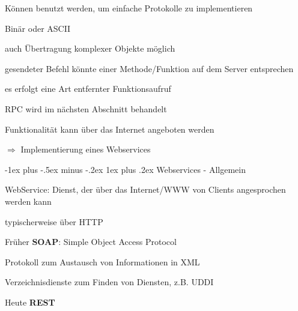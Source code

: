 \documentclass[10pt]{article}
\makeatletter
\renewcommand{\subsubsection}{\@startsection{subsubsection}{3}{0mm}%
                                {-1ex plus -.5ex minus -.2ex}%
                                {1ex plus .2ex}%
                                {\normalfont\small\bfseries}}
\makeatother
\begin{document}
\begin{itemize*}
  \item Können benutzt werden, um einfache Protokolle zu implementieren
  \item Binär oder ASCII
  \begin{itemize*}
    \item auch Übertragung komplexer Objekte möglich
  \end{itemize*}
  \item gesendeter Befehl könnte einer Methode/Funktion auf dem Server entsprechen
  \begin{itemize*}
    \item es erfolgt eine Art entfernter Funktionsaufruf
    \item RPC wird im nächsten Abschnitt behandelt
  \end{itemize*}
  \item Funktionalität kann über das Internet angeboten werden
  \begin{itemize*}
    \item[$\Rightarrow$] Implementierung eines Webservices
  \end{itemize*}
\end{itemize*}

\subsubsection{Webservices - Allgemein}
\begin{itemize*}
  \item WebService: Dienst, der über das Internet/WWW von Clients angesprochen werden kann
  \item typischerweise über HTTP
  \item Früher \textbf{SOAP}: Simple Object Access Protocol
  \begin{itemize*}
    \item Protokoll zum Austausch von Informationen in XML
    \item Verzeichnisdienste zum Finden von Diensten, z.B. UDDI
  \end{itemize*}
  \item Heute \textbf{REST}
\end{itemize*}
\end{document}
